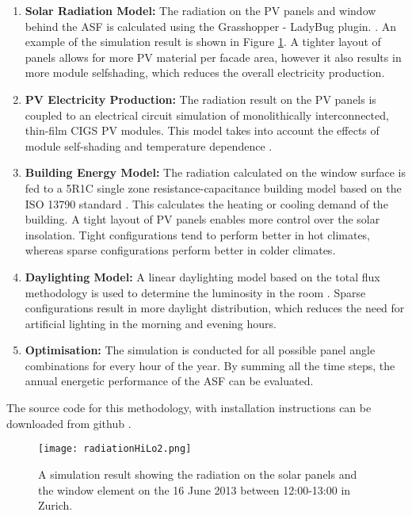 \begin{enumerate}
\item \textbf{Solar Radiation Model:} The radiation on the PV panels and window behind the ASF is calculated using the Grasshopper - LadyBug plugin.  \cite{roudsari2013ladybug}. An example of the simulation result is shown in Figure \ref{fig:radiation}. A tighter layout of panels allows for more PV material per facade area, however it also results in more module selfshading, which reduces the overall electricity production.
\item \textbf{PV Electricity Production:} The radiation result on the PV panels is coupled to an electrical circuit simulation of monolithically interconnected, thin-film CIGS PV modules. This model takes into account the effects of module self-shading and temperature dependence \cite{hofer2016parametric}. 
\item \textbf{Building Energy Model:} The radiation calculated on the window surface is fed to a 5R1C single zone resistance-capacitance building model based on the ISO 13790 standard \cite{de2008iso}. This calculates the heating or cooling demand of the building. A tight layout of PV panels enables more control over the solar insolation. Tight configurations tend to perform better in hot climates, whereas sparse configurations perform better in colder climates. 
\item \textbf{Daylighting Model:} A linear daylighting model based on the total flux methodology is used to determine the luminosity in the room \cite{szokolay1980handbook}. Sparse configurations result in more daylight distribution, which reduces the need for artificial lighting in the morning and evening hours.
\item \textbf{Optimisation:} The simulation is conducted for all possible panel angle combinations for every hour of the year. By summing all the time steps, the annual energetic performance of the ASF can be evaluated. 
\end{enumerate}
The source code for this methodology, with installation instructions can be downloaded from github \cite{ASFGitHub,RCGitHub}.


\begin{figure}
\begin{center}
\texttt{[image: radiationHiLo2.png]}
\caption{A simulation result showing the radiation on the solar panels and the window element on the 16 June 2013 between 12:00-13:00 in Zurich.}
\label{fig:radiation}
\end{center}
\end{figure}


